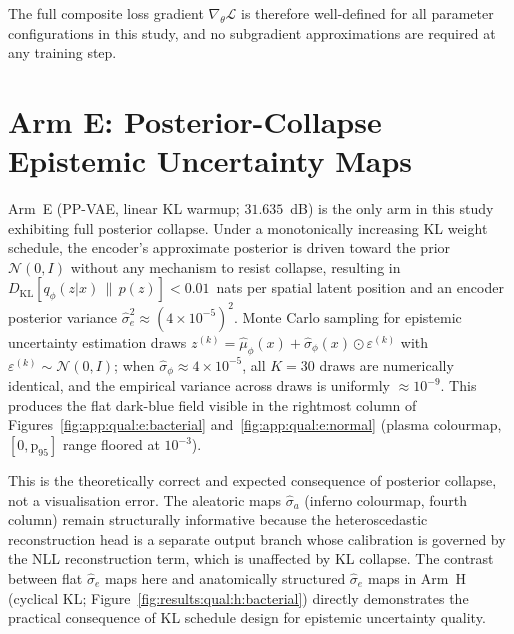 \documentclass[12pt, a4paper, twoside, openright]{book}
\begin{document}
\begin{appendices}
The full composite loss gradient $\nabla_\theta \mathcal{L}$ is therefore well-defined for all parameter configurations in this study, and no subgradient approximations are required at any training step.

\chapter{Arm E: Posterior-Collapse Epistemic Uncertainty Maps}
\label{app:arm_e_epistemic}

Arm~E (PP-VAE, linear KL warmup; $31.635$~dB) is the only arm in this study exhibiting full posterior collapse. Under a monotonically increasing KL weight schedule, the encoder's approximate posterior is driven toward the prior $\mathcal{N}(0,I)$ without any mechanism to resist collapse, resulting in $D_{\mathrm{KL}}[q_\phi(z|x)\,\|\,p(z)] < 0.01$~nats per spatial latent position and an encoder posterior variance $\hat{\sigma}^2_e \approx (4 \times 10^{-5})^2$. Monte Carlo sampling for epistemic uncertainty estimation draws $z^{(k)} = \hat{\mu}_\phi(x) + \hat{\sigma}_\phi(x) \odot \varepsilon^{(k)}$ with $\varepsilon^{(k)} \sim \mathcal{N}(0,I)$; when $\hat{\sigma}_\phi \approx 4\times10^{-5}$, all $K=30$ draws are numerically identical, and the empirical variance across draws is uniformly $\approx\!10^{-9}$. This produces the flat dark-blue field visible in the rightmost column of Figures~\ref{fig:app:qual:e:bacterial} and~\ref{fig:app:qual:e:normal} (plasma colourmap, $[0, \mathrm{p}_{95}]$ range floored at $10^{-3}$).

This is the theoretically correct and expected consequence of posterior collapse, not a visualisation error. The aleatoric maps $\hat{\sigma}_a$ (inferno colourmap, fourth column) remain structurally informative because the heteroscedastic reconstruction head is a separate output branch whose calibration is governed by the NLL reconstruction term, which is unaffected by KL collapse. The contrast between flat $\hat{\sigma}_e$ maps here and anatomically structured $\hat{\sigma}_e$ maps in Arm~H (cyclical KL; Figure~\ref{fig:results:qual:h:bacterial}) directly demonstrates the practical consequence of KL schedule design for epistemic uncertainty quality.


\end{appendices}
\end{document}
